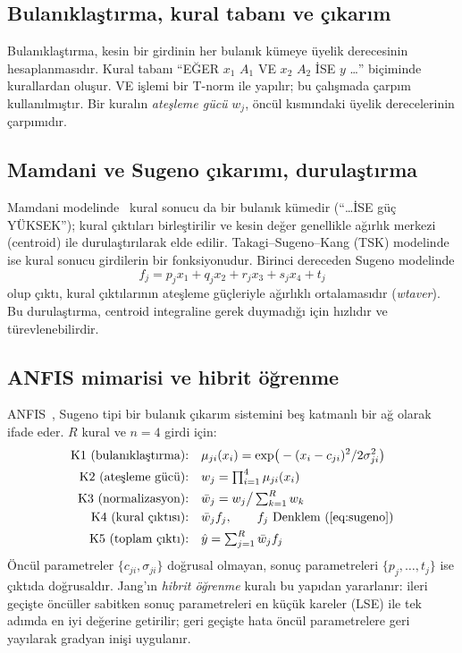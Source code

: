 \documentclass[11pt,a4paper]{article}
\begin{document}
\subsection{Bulanıklaştırma, kural tabanı ve çıkarım}
Bulanıklaştırma, kesin bir girdinin her bulanık kümeye üyelik derecesinin hesaplanmasıdır. Kural tabanı “EĞER $x_1$ $A_1$ VE $x_2$ $A_2$ İSE $y$ \ldots” biçiminde kurallardan oluşur. VE işlemi bir T-norm ile yapılır; bu çalışmada çarpım kullanılmıştır. Bir kuralın \emph{ateşleme gücü} $w_j$, öncül kısmındaki üyelik derecelerinin çarpımıdır.

\subsection{Mamdani ve Sugeno çıkarımı, durulaştırma}
Mamdani modelinde~\cite{mamdani1975} kural sonucu da bir bulanık kümedir (“\ldots İSE güç YÜKSEK”); kural çıktıları birleştirilir ve kesin değer genellikle ağırlık merkezi (centroid) ile durulaştırılarak elde edilir. Takagi–Sugeno–Kang (TSK) modelinde~\cite{takagi1985} ise kural sonucu girdilerin bir fonksiyonudur. Birinci dereceden Sugeno modelinde
\begin{equation}
f_j = p_j x_1 + q_j x_2 + r_j x_3 + s_j x_4 + t_j
\label{eq:sugeno}
\end{equation}
olup çıktı, kural çıktılarının ateşleme güçleriyle ağırlıklı ortalamasıdır (\emph{wtaver}). Bu durulaştırma, centroid integraline gerek duymadığı için hızlıdır ve türevlenebilirdir.

\subsection{ANFIS mimarisi ve hibrit öğrenme}
ANFIS~\cite{jang1993}, Sugeno tipi bir bulanık çıkarım sistemini beş katmanlı bir ağ olarak ifade eder. $R$ kural ve $n=4$ girdi için:
\begin{align}
\text{K1 (bulanıklaştırma):}\quad & \mu_{ji}(x_i)=\exp\!\big(-(x_i-c_{ji})^2/2\sigma_{ji}^2\big)\\
\text{K2 (ateşleme gücü):}\quad & w_j=\textstyle\prod_{i=1}^{4}\mu_{ji}(x_i)\\
\text{K3 (normalizasyon):}\quad & \bar w_j = w_j\big/\textstyle\sum_{k=1}^{R} w_k\\
\text{K4 (kural çıktısı):}\quad & \bar w_j f_j,\qquad f_j \text{ Denklem~(\ref{eq:sugeno})}\\
\text{K5 (toplam çıktı):}\quad & \hat y=\textstyle\sum_{j=1}^{R}\bar w_j f_j
\end{align}
Öncül parametreler $\{c_{ji},\sigma_{ji}\}$ doğrusal olmayan, sonuç parametreleri $\{p_j,\ldots,t_j\}$ ise çıktıda doğrusaldır. Jang'ın \emph{hibrit öğrenme} kuralı bu yapıdan yararlanır: ileri geçişte öncüller sabitken sonuç parametreleri en küçük kareler (LSE) ile tek adımda en iyi değerine getirilir; geri geçişte hata öncül parametrelere geri yayılarak gradyan inişi uygulanır.
\end{document}
